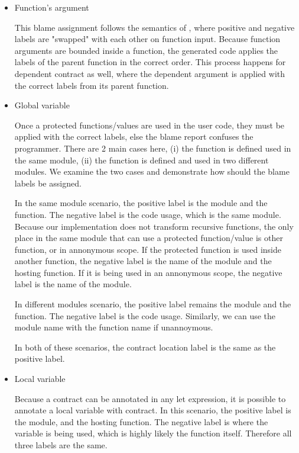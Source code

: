 \begin{itemize}
\item Function's argument

This blame assignment follows the semantics of \langc, where positive and
negative labels are "swapped" with each other on function input. Because
function arguments are bounded inside a function, the generated code
applies the labels of the parent function in the correct order. This
process happens for dependent contract as well, where the dependent
argument is applied with the correct labels from its parent function.

\item Global variable

Once a protected functions/values are used in the user code, they must be
applied with the correct labels, else the blame report confuses the
programmer. There are 2 main cases here, (i) the function is defined used
in the same module, (ii) the function is defined and used in two different
modules. We examine the two cases and demonstrate how should the blame
labels be assigned.

In the same module scenario, the positive label is the module and the function.
The negative label is the code usage, which is the same module. Because our
implementation does not transform recursive functions, the only place in
the same module that can use a protected function/value is other function,
or in annonymous scope. If the protected function is used inside another
function, the negative label is the name of the module and the hosting
function. If it is being used in an annonymous scope, the negative label is
the name of the module.

In different modules scenario, the positive label remains the module and the
function. The negative label is the code usage. Similarly, we can use the
module name with the function name if unannoymous.

In both of these scenarios, the contract location label is the same as the
positive label.

\item Local variable

Because a contract can be annotated in any let expression, it is possible to
annotate a local variable with contract. In this scenario, the positive
label is the module, and the hosting function. The negative label is where
the variable is being used, which is highly likely the function itself.
Therefore all three labels are the same.

\end{itemize}
